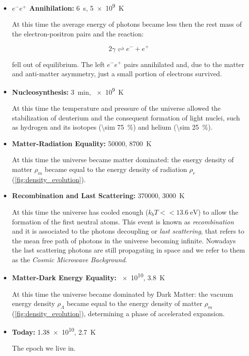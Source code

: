 \begin{itemize}
        \item \textbf{$e^-e^+$ Annihilation:} \SI{6}{\second},
        \SI{5e9}{\kelvin}

        At this time the average energy of photons became less then the rest mass
        of the electron-positron pairs and the reaction:

        \begin{equation}
                2\gamma \rightleftharpoons e^- + e^+
        \end{equation}

        fell out of equilibrium. The left $e^-e^+$ pairs annihilated and,
        due to the matter and anti-matter asymmetry, just a small portion
        of electrons survived.

        \item \textbf{Nucleosynthesis:} \SI{3}{\minute}, \SI{e9}{\kelvin}

        At this time the temperature and pressure of the universe allowed
        the stabilization of deuterium and the consequent formation of
        light nuclei, such as hydrogen and its isotopes
        (\SI{\sim 75}{\percent}) and helium (\SI{\sim 25}{\percent}).

        \item \textbf{Matter-Radiation Equality:} \SI{50000}{\year},
        \SI{8700}{\kelvin}

        At this time the universe became matter dominated: the energy
        density of matter $\rho_m$ became equal to the energy density of
        radiation $\rho_r$ (\autoref{fig:density_evolution}).

        \item \textbf{Recombination and Last Scattering:} \SI{370000}{\year},
        \SI{3000}{\kelvin}

        At this time the universe has cooled enough ($k_bT <<
        \SI{13.6}{\electronvolt}$) to allow the formation of the first
        neutral atoms. This event is known as \emph{recombination} and it is
        associated to the photons decoupling or \emph{last scattering}, that
        refers to the mean free path of photons in the universe becoming
        infinite. Nowadays the last scattering photons are still propagating in
        space and we refer to them as the \emph{Cosmic Microwave Background}.

        \item \textbf{Matter-Dark Energy Equality:} \SI{e10}{\year},
        \SI{3.8}{\kelvin}

        At this time the universe became dominated by Dark Matter: the
        vacuum energy density $\rho_\Lambda$ became equal to the energy density of
        matter $\rho_m$ (\autoref{fig:density_evolution}), determining a
        phase of accelerated expansion.

        \item \textbf{Today:} \SI{1.38e10}{\year}, \SI{2.7}{\kelvin}

        The epoch we live in.
\end{itemize}

